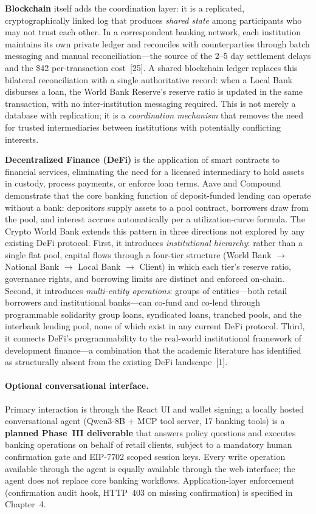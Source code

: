 \documentclass[12pt,a4paper]{report}
\begin{document}
\textbf{Blockchain} itself adds the coordination layer: it is a replicated, cryptographically linked log that produces \textit{shared state} among participants who may not trust each other. In a correspondent banking network, each institution maintains its own private ledger and reconciles with counterparties through batch messaging and manual reconciliation---the source of the 2--5 day settlement delays and the \$42 per-transaction cost~[25]. A shared blockchain ledger replaces this bilateral reconciliation with a single authoritative record: when a Local Bank disburses a loan, the World Bank Reserve's reserve ratio is updated in the same transaction, with no inter-institution messaging required. This is not merely a database with replication; it is a \textit{coordination mechanism} that removes the need for trusted intermediaries between institutions with potentially conflicting interests.

\textbf{Decentralized Finance (DeFi)} is the application of smart contracts to financial services, eliminating the need for a licensed intermediary to hold assets in custody, process payments, or enforce loan terms. Aave and Compound demonstrate that the core banking function of deposit-funded lending can operate without a bank: depositors supply assets to a pool contract, borrowers draw from the pool, and interest accrues automatically per a utilization-curve formula. The Crypto World Bank extends this pattern in three directions not explored by any existing DeFi protocol. First, it introduces \textit{institutional hierarchy}: rather than a single flat pool, capital flows through a four-tier structure (World Bank $\to$ National Bank $\to$ Local Bank $\to$ Client) in which each tier's reserve ratio, governance rights, and borrowing limits are distinct and enforced on-chain. Second, it introduces \textit{multi-entity operations}: groups of entities---both retail borrowers and institutional banks---can co-fund and co-lend through programmable solidarity group loans, syndicated loans, tranched pools, and the interbank lending pool, none of which exist in any current DeFi protocol. Third, it connects DeFi's programmability to the real-world institutional framework of development finance---a combination that the academic literature has identified as structurally absent from the existing DeFi landscape~[1].

\paragraph{Optional conversational interface.}
Primary interaction is through the React UI and wallet signing; a locally hosted conversational agent (Qwen3-8B + MCP tool server, 17 banking tools) is a \textbf{planned Phase~III deliverable} that answers policy questions and executes banking operations on behalf of retail clients, subject to a mandatory human confirmation gate and EIP-7702 scoped session keys. Every write operation available through the agent is equally available through the web interface; the agent does not replace core banking workflows. Application-layer enforcement (confirmation audit hook, HTTP~403 on missing confirmation) is specified in Chapter~4.
\end{document}
